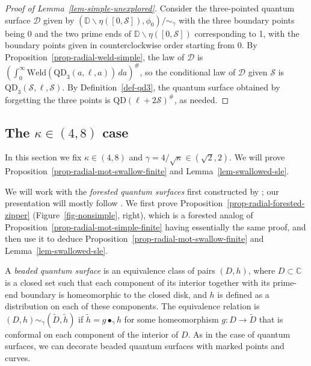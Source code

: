 \documentclass[a4paper]{article}
\numberwithin{equation}{section}
\newcommand{\wt}{\widetilde}
\newcommand{\D}{\mathbb{D}}
\newcommand{\cD}{\mathcal{D}}
\newcommand{\cS}{\mathcal{S}}
\newcommand{\qduration}{\mathcal{S}}
\newcommand{\QD}{\mathrm{QD}}
\theoremstyle{remark}
\numberwithin{equation}{section}
\begin{document}
\begin{proof}[{Proof of Lemma~\ref{lem-simple-unexplored}}]
Consider the three-pointed quantum surface $\cD$ given by $(\D \backslash \eta([0,\qduration]), \phi_0)/{\sim_\gamma}$ with the three boundary points being $0$ and the two prime ends of $\D \backslash \eta([0,\qduration])$ corresponding to 1, with the boundary points given in counterclockwise order starting from 0. 
    By Proposition~\ref{prop-radial-weld-simple}, the law of $\cD$ is $\left(\int_0^\infty \mathrm{Weld}(\QD_{3}(a, \ell, a)) \, da \right)^\#$, so 
    the conditional law of $\cD$ given $\qduration$ is $\QD_3(\cS, \ell, \cS)$. By Definition~\ref{def-qd3}, the quantum surface obtained by forgetting the three points is $\QD(\ell + 2\cS)^\#$, as needed. 
\end{proof}

\subsection{The $\kappa \in (4,8)$ case}\label{sec-zip-nonsimple}
In this section we fix $\kappa \in (4,8)$ and $\gamma = 4/\sqrt\kappa \in (\sqrt2,2)$.
We will prove Proposition~\ref{prop-radial-mot-swallow-finite} and Lemma~\ref{lem-swallowed-sle}. 

We will work with the \emph{forested quantum surfaces} first constructed by \cite{DMS14}; our presentation will mostly follow \cite{ahsy-nonsimple}. We first prove Proposition~\ref{prop-radial-forested-zipper} (Figure~\ref{fig-nonsimple}, right), which is a forested analog of Proposition~\ref{prop-radial-mot-simple-finite} having essentially the same proof, and then use it to deduce Proposition~\ref{prop-radial-mot-swallow-finite} and Lemma~\ref{lem-swallowed-sle}.

A \emph{beaded quantum surface} is an equivalence class of pairs $(D,h)$, where $D \subset \mathbb C$ is a closed set such that each component of its interior together with its prime-end boundary is homeomorphic to the closed disk, and $h$ is defined as a distribution on each of these components. The equivalence relation is $(D, h) \sim_\gamma (\wt D, \wt h)$ if $\wt h = g \bullet_\gamma h$ for some homeomorphism $g: D \to \wt D$ that is conformal on each component of the interior of $D$. As in the case of quantum surfaces, we can decorate beaded quantum surfaces with marked points and curves.
\end{document}
